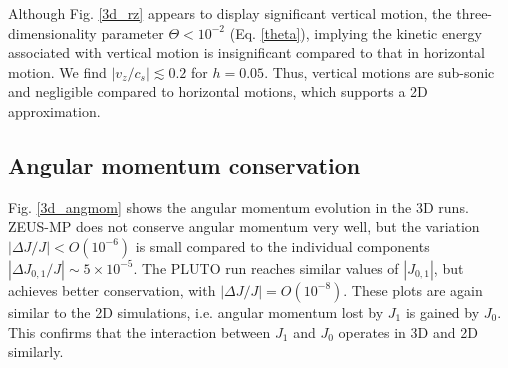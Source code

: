 Although Fig. \ref{3d_rz} appears to display significant vertical motion,
the three-dimensionality parameter $\Theta < 10^{-2}$
(Eq. \ref{theta}), implying the kinetic energy associated with
vertical motion is insignificant compared to that in horizontal
motion. We find  $|v_z/c_s|\lesssim 
0.2$ for $h=0.05$. Thus, vertical motions are sub-sonic and negligible
compared to horizontal motions, which supports a 2D approximation. 





\subsection{Angular momentum conservation} 
Fig. \ref{3d_angmom} shows the angular momentum evolution in the 3D
runs. ZEUS-MP does not conserve angular momentum very well, but the
variation $|\Delta J/J|< O(10^{-6})$ is small compared 
to the individual components $|\Delta J_{0,1}/J|\sim 
5\times10^{-5}$. The PLUTO run reaches similar values of
$|J_{0,1}|$, but achieves better conservation, with $|\Delta
J/J|=O(10^{-8})$. These plots are again similar to the 2D simulations,
i.e. angular momentum lost by $J_1$ is gained by $J_0$. This confirms 
that the interaction between $J_1$ and $J_0$ operates in 3D and 2D
similarly.  


